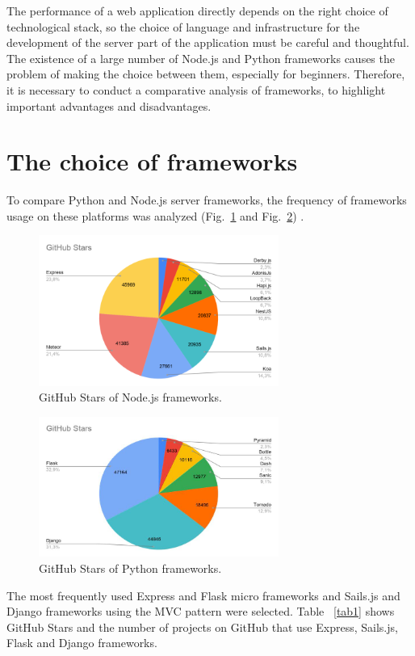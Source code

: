 \documentclass[runningheads]{llncs}
\begin{document}
The performance of a web application directly depends on the right choice of technological stack, so the choice of language and infrastructure for the development of the server part of the application must be careful and thoughtful. The existence of a large number of Node.js and Python frameworks causes the problem of making the choice between them, especially for beginners. Therefore, it is necessary to conduct a comparative analysis of frameworks, to highlight important advantages and disadvantages.

\section{The choice of frameworks}
To compare Python and Node.js server frameworks, the frequency of frameworks usage on these platforms was analyzed (Fig.~\ref{fig1} and Fig.~\ref{fig2}) .


\begin{figure}
    \begin{center}
        \includegraphics[width=0.7\textwidth]{fig-1.png}
    \end{center}
    \caption{GitHub Stars of Node.js frameworks.} \label{fig1}
\end{figure}

\begin{figure}
    \begin{center}
        \includegraphics[width=0.7\textwidth]{fig-2.png}
    \end{center}
    \caption{GitHub Stars of Python frameworks.} \label{fig2}
\end{figure}
The most frequently used Express and Flask micro frameworks and Sails.js and Django frameworks using the MVC pattern were selected. Table ~\ref{tab1} shows GitHub Stars and the number of projects on GitHub that use Express, Sails.js, Flask and Django frameworks.
\end{document}
